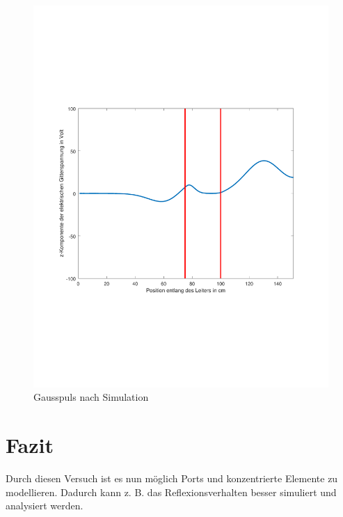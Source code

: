 \documentclass[Protokollheft.tex]{subfiles}
\begin{document}
\begin{figure}[ht]
	\centering
	\includegraphics[trim = 20mm 65mm 20mm 65mm, clip,width=0.7\linewidth]{untitledG3.pdf}
	\caption{Gausspuls nach Simulation}\label{fig:inh6}
\end{figure} 






\section{Fazit}
Durch diesen Versuch ist es nun möglich Ports und konzentrierte Elemente zu modellieren. Dadurch kann z. B. das Reflexionsverhalten besser simuliert und analysiert werden.
\end{document}
